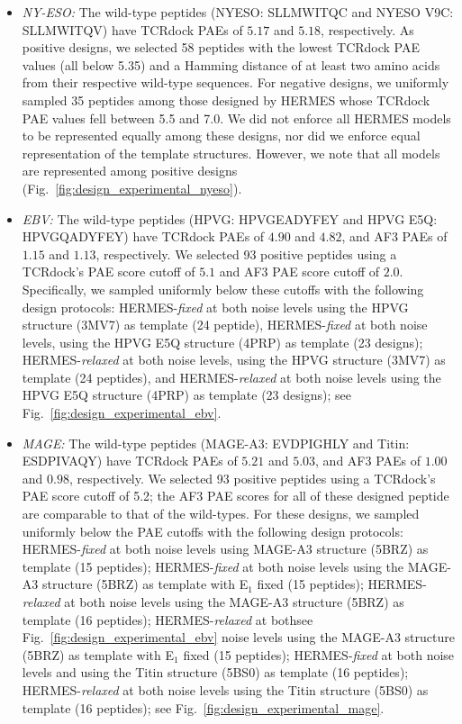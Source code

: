 \begin{itemize}

\item {\em NY-ESO:} The wild-type peptides (NYESO: SLLMWITQC and NYESO V9C: SLLMWITQV) have TCRdock
PAEs of $5.17$ and $5.18$, respectively.
As positive designs, we selected 58 peptides with the lowest TCRdock PAE values (all below 5.35) and
a Hamming distance of at least two amino acids from their respective wild-type sequences. For
negative designs, we uniformly sampled 35 peptides among those designed by HERMES whose TCRdock PAE
values fell between 5.5 and 7.0. We did not enforce all HERMES models to be represented equally
among these designs, nor did we enforce equal representation of the template structures. However, we
note that all models are represented among positive designs
(Fig.~\ref{fig:design_experimental_nyeso}).

\item {\em EBV:} The wild-type peptides (HPVG: HPVGEADYFEY and HPVG E5Q: HPVGQADYFEY) have TCRdock
PAEs of $4.90$ and $4.82$, and AF3 PAEs of $1.15$ and $1.13$, respectively. We selected 93 positive
peptides using a TCRdock's PAE score cutoff of $5.1$ and AF3 PAE score cutoff of $2.0$.
Specifically, we sampled uniformly below these cutoffs with the following design protocols:
HERMES-{\em fixed} at both noise levels using the HPVG structure (3MV7) as template (24 peptide),
HERMES-{\em fixed} at both noise levels, using the HPVG E5Q structure (4PRP) as template (23
designs); HERMES-{\em relaxed} at both noise levels, using the HPVG structure (3MV7) as template (24
peptides), and HERMES-{\em relaxed} at both noise levels using the HPVG E5Q structure (4PRP) as
template (23 designs); see Fig.~\ref{fig:design_experimental_ebv}.


\item {\em MAGE:} The wild-type peptides (MAGE-A3: EVDPIGHLY and Titin: ESDPIVAQY) have TCRdock PAEs
of $5.21$ and $5.03$, and AF3 PAEs of $1.00$ and $0.98$, respectively. We selected 93 positive
peptides using a TCRdock's PAE score cutoff of 5.2; the AF3 PAE scores for all of these designed
peptide are comparable to that of the wild-types. For these designs, we sampled uniformly below the
PAE cutoffs with the following design protocols: HERMES-{\em fixed} at both noise levels using
MAGE-A3 structure (5BRZ) as template (15 peptides); HERMES-{\em fixed} at both noise levels using
the MAGE-A3 structure (5BRZ) as template with E$_1$ fixed (15 peptides); HERMES-{\em relaxed} at
both noise levels using the MAGE-A3 structure (5BRZ) as template (16 peptides); HERMES-{\em relaxed}
at bothsee Fig.~\ref{fig:design_experimental_ebv} noise levels using the MAGE-A3 structure (5BRZ) as
template with E$_1$ fixed (15 peptides); HERMES-{\em fixed} at both noise levels and using the Titin
structure (5BS0) as template (16 peptides); HERMES-{\em relaxed} at both noise levels using the
Titin structure (5BS0) as template (16 peptides); see Fig.~\ref{fig:design_experimental_mage}.
\end{itemize}

